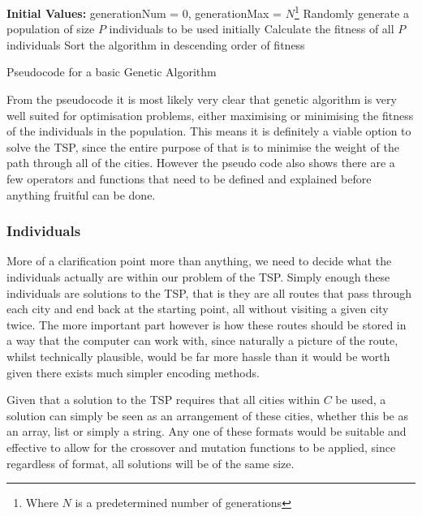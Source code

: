 \documentclass[11pt,a4paper,titlepage]{article}
\begin{document}
\begin{algorithm}[H]
\SetAlgoLined
\textbf{Initial Values:} generationNum = 0, generationMax = $N$\footnote{Where $N$ is a predetermined number of generations}\;
Randomly generate a population of size $P$ individuals to be used initially\;
Calculate the fitness of all $P$ individuals\;
Sort the algorithm in descending order of fitness\;
\caption{Pseudocode for a basic Genetic Algorithm}
\end{algorithm}

From the pseudocode it is most likely very clear that genetic algorithm is very well suited for optimisation problems, either maximising or minimising the fitness of the individuals in the population. This means it is definitely a viable option to solve the TSP, since the entire purpose of that is to minimise the weight of the path through all of the cities. However the pseudo code also shows there are a few operators and functions that need to be defined and explained before anything fruitful can be done.

\subsubsection{Individuals}

More of a clarification point more than anything, we need to decide what the individuals actually are within our problem of the TSP. Simply enough these individuals are solutions to the TSP, that is they are all routes that pass through each city and end back at the starting point, all without visiting a given city twice. The more important part however is how these routes should be stored in a way that the computer can work with, since naturally a picture of the route, whilst technically plausible, would be far more hassle than it would be worth given there exists much simpler encoding methods.

Given that a solution to the TSP requires that all cities within $C$ be used, a solution can simply be seen as an arrangement of these cities, whether this be as an array, list or simply a string. Any one of these formats would be suitable and effective to allow for the crossover and mutation functions to be applied, since regardless of format, all solutions will be of the same size.
\end{document}
